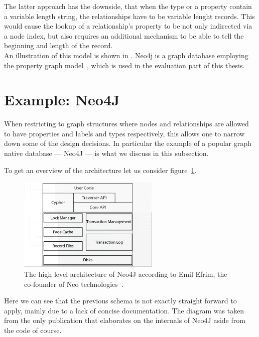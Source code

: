     The latter approach has the downside, that when the type or a property contain a variable length string, the relationships have to be variable lenght records. 
    This would cause the lookup of a relationship's property to be not only indirected via a node index, but also requires an additional mechanism to be able to tell the beginning and length of the record. \\
    An illustration of this model is shown in .
    Neo4j is a graph database employing the property graph model~\cite{robinson2015graph}, which is used in the evaluation part of this thesis.
    
\section{Example: Neo4J}\label{\positionnumber}
    When restricting to graph structures where nodes and relationships are allowed to have properties and labels and types respectively, this allows one to narrow down some of the design decisions.
    In particular the example of a popular graph native database --- Neo4J --- is what we discuss in this subsection.

    To get an overview of the architecture let us consider figure~\ref{N4J_HLA_Emil}. 

    \begin{figure}[htp]
    \begin{center}
    \includegraphics[keepaspectratio,width=0.6\textwidth]{img/00_intro/N4J_HLA_Emil.png}
    \end{center}
    \caption{The high level architecture of Neo4J according to Emil Efrim, the co-founder of Neo technologies~\autocite{robinson2015graph}.} 
    \label{N4J_HLA_Emil}
    \end{figure}

    Here we can see that the previous schema is not exactly straight forward to apply, mainly due to a lack of concise documentation.
    The diagram was taken from the only publication that elaborates on the internals of Neo4J aside from the code of course.
    
